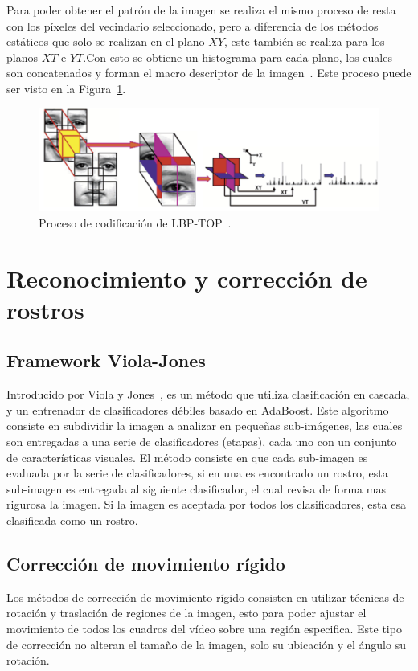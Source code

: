 Para poder obtener el patrón de la imagen se realiza el mismo proceso de resta con los píxeles del vecindario seleccionado, pero a diferencia de los métodos estáticos que solo se realizan en el plano $XY$, este también se realiza para los planos $XT$ e $YT$.\@ Con esto se obtiene un histograma para cada plano, los cuales son concatenados y forman el macro descriptor de la imagen~\cite{Zhao2007}. Este proceso puede ser visto en la Figura~\ref{art:fig:lbptop}.


\begin{figure}[tb]
  \centering
   \includegraphics[width=1\textwidth]{Figuras/lbptop.pdf}
  \caption{Proceso de codificación de LBP-TOP~\cite{Zhao2007}.}
  \label{art:fig:lbptop}
\end{figure}


\section{Reconocimiento y corrección de rostros}
\label{sec:rec_rostros}

	\subsection{Framework Viola-Jones}
	\label{sec:viola-jones}
	Introducido por Viola y Jones~\cite{Jones2003}, es un método que utiliza clasificación en cascada, y un entrenador de clasificadores débiles basado en AdaBoost. Este algoritmo consiste en subdividir la imagen a analizar en pequeñas sub-imágenes, las cuales son entregadas a una serie de clasificadores (etapas), cada uno con un conjunto de características visuales. El método consiste en que cada sub-imagen es evaluada por la serie de clasificadores, si en una es encontrado un rostro, esta sub-imagen es entregada al siguiente clasificador, el cual revisa de forma mas rigurosa la imagen. Si la imagen es aceptada por todos los clasificadores, esta esa clasificada como un rostro.
	
	\subsection{Corrección de movimiento rígido}
	\label{sec:rigid}
	Los métodos de corrección de movimiento rígido consisten en utilizar técnicas de rotación y traslación de regiones de la imagen, esto para poder ajustar el movimiento de todos los cuadros del vídeo sobre una región especifica. Este tipo de corrección no alteran el tamaño de la imagen, solo su ubicación y el ángulo su rotación.

